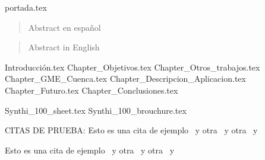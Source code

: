 \documentclass[a4paper,openany,oneside,12pt]{report}
\begin{document}

	{portada.tex}
	\newpage
	\mbox{}
	\thispagestyle{empty} %
	\pagestyle{fancy}

\onehalfspace



\begin{abstract}
	\setcounter{page}{2}
	Abstract en español
	\thispagestyle{plain}
\end{abstract}
\begin{abstract}
	\setcounter{page}{3}
	Abstract in English
	\thispagestyle{plain}
\end{abstract}


	\setcounter{page}{4}
	\tableofcontents
	\listoffigures %
	\listoftables
	


	

	{Introducción.tex}
	{Chapter_Objetivos.tex}
	{Chapter_Otros_trabajos.tex}
	{Chapter_GME_Cuenca.tex}
	{Chapter_Descripcion_Aplicacion.tex}
	{Chapter_Futuro.tex}
	{Chapter_Conclusiones.tex}
	
	
	\appendix
	\appendixpage
		{Synthi_100_sheet.tex}
		{Synthi_100_brouchure.tex}
	
	
	CITAS DE PRUEBA: Esto es una cita de ejemplo~\cite{Lieb} y otra~ y otra~ y~\cite{GME}  ~\cite{SC_book} ~\cite{Csound_book}
	
\cite[para más detalles]{Synthi_users_manual}
 Esto es una cita de ejemplo~\cite{Synthi_users_manual} y otra~ y otra~ y~\cite{Synthi_users_manual}


	
\end{document}
